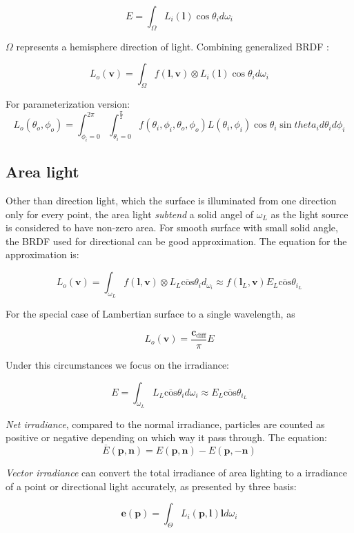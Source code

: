 \documentclass[10pt, a4paper]{article}
\begin{document}
        
        $$E = \int_{\Omega}L_i(\textbf{l})\cos{\theta_i}d\omega_i$$

        $\Omega$ represents a hemisphere direction of light. Combining generalized BRDF :
        
        $$L_o(\textbf{v}) = \int_{\Omega}f(\textbf{l}, \textbf{v}) \otimes L_i(\textbf{l})\cos{\theta_i}d\omega_i$$

        For parameterization version:
        $$L_o(\theta_o, \phi_o) = \int_{\phi_i = 0}^{2\pi}\int_{\theta_i = 0}^{\frac{\pi}{2}}f(\theta_i, \phi_i, \theta_o, \phi_o) L(\theta_i, \phi_i)\cos{\theta_i}\sin{theta_i}d\theta_i d\phi_i$$

    \subsection{Area light}
        Other than direction light, which the surface is illuminated from one direction only for every point, the area light \emph{subtend} a solid  angel of $\omega_L$ as the light source is considered to have non-zero area. For smooth surface with small solid angle, the BRDF used for directional can be good approximation. The equation for the approximation is:

        $$L_o(\textbf{v}) = \int_{\omega_L}f(\textbf{l}, \textbf{v}) \otimes L_L\overline{\text{cos}}\theta_id_{\omega_i} \approx f(\textbf{l}_L, \textbf{v}) E_L\overline{\text{cos}}\theta_{i_L}$$ 

        For the special case of Lambertian surface to a single wavelength, as 
        
        $$L_o(\textbf{v}) = \frac{\textbf{c}_{\text{diff}}}{\pi}E$$

        Under this circumstances we focus on the irradiance:

        $$E = \int_{\omega_L}L_L\overline{\text{cos}}\theta_id\omega_i \approx E_L\overline{\text{cos}}\theta_{i_L}$$

        \emph{Net irradiance}, compared to the normal irradiance, particles are counted as positive or negative depending on which way it pass through. The equation: 
            $$\overline{E}(\textbf{p}, \textbf{n}) = E(\textbf{p}, \textbf{n}) - E(\textbf{p}, -\textbf{n})$$
        
        \emph{Vector irradiance} can convert the total irradiance of area lighting to a irradiance of a point or directional light accurately, as presented by three basis:

        $$\textbf{e}(\textbf{p}) = \int_{\Theta}L_i(\textbf{p}, \textbf{l})\textbf{l}d\omega_i$$
\end{document}
